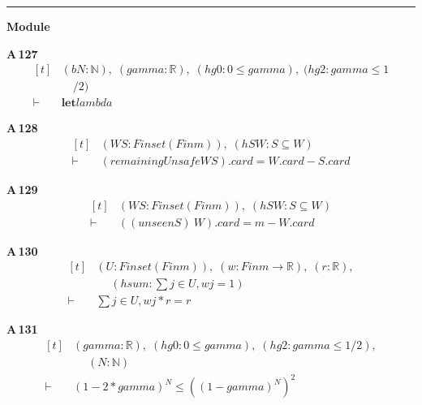 \vspace{4pt}\noindent\rule{\columnwidth}{0.4pt}\par\vspace{2pt}
\noindent\textbf{Module }\par\vspace{3pt}

\noindent\textbf{A\,127}\quad{}
{\footnotesize\[ \begin{aligned}[t]
&(\mathit{b} \mathit{N} : \mathbb{N} ),\; (\mathit{gamma} : \mathbb{R} ),\; (\mathit{hg0} : 0\leq \mathit{gamma}),\; (\mathit{hg2} : \mathit{gamma}\leq 1\\
&\quad /2)\\
\vdash\;&\mathbf{let} \mathit{lambda}
\end{aligned} \]}

\noindent\textbf{A\,128}\quad{}
{\footnotesize\[ \begin{aligned}[t]
&(\mathit{W} \mathit{S} : \mathit{Finset} (\mathit{Fin} \mathit{m})),\; (\mathit{hSW} : \mathit{S} \subseteq \mathit{W})\\
\vdash\;&(\mathit{remainingUnsafe} \mathit{W} \mathit{S}).\mathit{card}=\mathit{W}.\mathit{card}-\mathit{S}.\mathit{card}
\end{aligned} \]}

\noindent\textbf{A\,129}\quad{}
{\footnotesize\[ \begin{aligned}[t]
&(\mathit{W} \mathit{S} : \mathit{Finset} (\mathit{Fin} \mathit{m})),\; (\mathit{hSW} : \mathit{S} \subseteq \mathit{W})\\
\vdash\;&((\mathit{unseen} \mathit{S}) \ \mathit{W}).\mathit{card}=\mathit{m}-\mathit{W}.\mathit{card}
\end{aligned} \]}

\noindent\textbf{A\,130}\quad{}
{\footnotesize\[ \begin{aligned}[t]
&(\mathit{U} : \mathit{Finset} (\mathit{Fin} \mathit{m})),\; (\mathit{w} : \mathit{Fin} \mathit{m} \to \mathbb{R} ),\; (\mathit{r} : \mathbb{R} ),\\
&\quad \; (\mathit{hsum} : \textstyle\sum \mathit{j} \in \mathit{U},\mathit{w} \mathit{j}=1)\\
\vdash\;&\textstyle\sum \mathit{j} \in \mathit{U},\mathit{w} \mathit{j}*\mathit{r}=\mathit{r}
\end{aligned} \]}

\noindent\textbf{A\,131}\quad{}
{\footnotesize\[ \begin{aligned}[t]
&(\mathit{gamma} : \mathbb{R} ),\; (\mathit{hg0} : 0\leq \mathit{gamma}),\; (\mathit{hg2} : \mathit{gamma}\leq 1/2),\\
&\quad \; (\mathit{N} : \mathbb{N} )\\
\vdash\;&(1-2*\mathit{gamma})^{\mathit{N}} \leq ((1-\mathit{gamma})^{\mathit{N}})^{2}
\end{aligned} \]}

